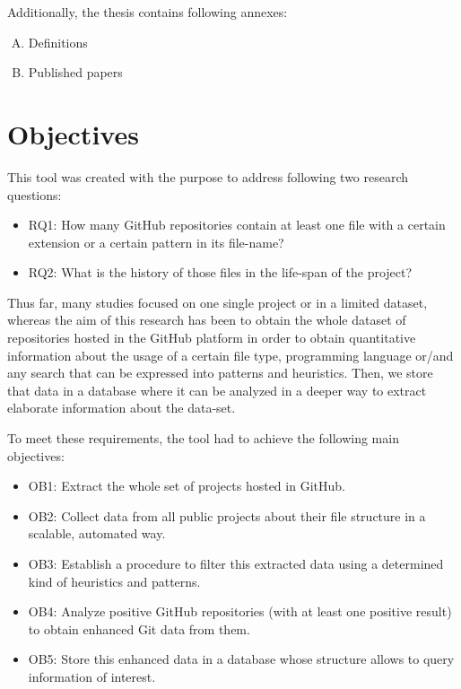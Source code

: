 \documentclass[a4paper, 12pt]{book}
\begin{document}
Additionally, the thesis contains following annexes:
\begin{enumerate}[A.]
  \item Definitions
  \item Published papers
\end{enumerate}

\cleardoublepage
\chapter{Objectives}
\label{sec:objectives}

This tool was created with the purpose to address following two research questions:
\begin{itemize}
  \item RQ1: How many GitHub repositories contain at least one file with a certain extension or a certain
        pattern in its file-name?
  \item RQ2: What is the history of those files in the life-span of the project?
\end{itemize}

Thus far, many studies focused on one single project or in a limited dataset,
whereas the aim of this research has been to obtain the whole dataset of repositories hosted in the GitHub platform
in order to obtain quantitative information about the usage of a certain file type, programming language
or/and any search that can be expressed into patterns and heuristics. Then, we store that data in a database
where it can be analyzed in a deeper way to extract elaborate information about the data-set.

To meet these requirements, the tool had to achieve the following main objectives:
\begin{itemize}
  \item OB1: Extract the whole set of projects hosted in GitHub.
  \item OB2: Collect data from all public projects about their file structure in a scalable, automated way.
  \item OB3: Establish a procedure to filter this extracted data using a determined kind of heuristics and patterns.
  \item OB4: Analyze positive GitHub repositories (with at least one positive result) to obtain enhanced Git data from them.
  \item OB5: Store this enhanced data in a database whose structure allows to query information of interest.
\end{itemize}
\end{document}
